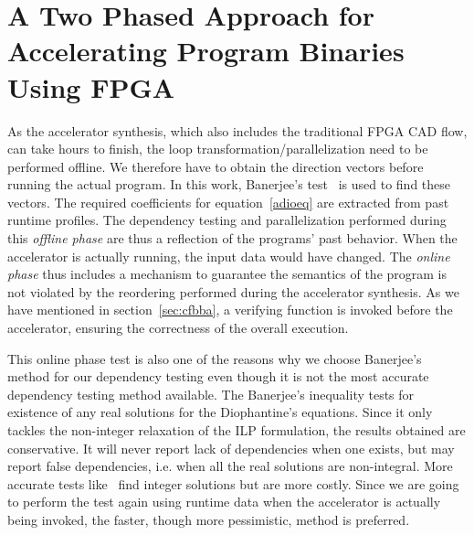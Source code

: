 \section{A Two Phased Approach for Accelerating Program Binaries Using FPGA}
\label{makingAcc}
As the accelerator synthesis, which also includes the traditional FPGA CAD flow,
can take hours to finish, the loop transformation/parallelization need to be performed offline. We therefore have to obtain the direction vectors 
before running the actual program. 
In this work, Banerjee's test~\cite{banerjee} is used to find these vectors. The required coefficients for equation~\ref{adioeq} are extracted from past runtime profiles. The dependency testing and parallelization performed during this \textit{offline phase} are  thus a reflection of the programs' past behavior. When the accelerator is actually running, the input data would have changed. The \textit{online phase} thus includes a mechanism to guarantee the 
semantics of the program is not violated by the reordering performed during
the accelerator synthesis. As we have mentioned in section~\ref{sec:cfbba},
a verifying function is invoked before the accelerator, ensuring the correctness
of the overall execution. 



This online phase test is also one of the reasons why we choose Banerjee's method for our dependency testing even though it is not the most accurate dependency testing method
available. The Banerjee's inequality tests for existence of any real solutions for the Diophantine's equations. Since it only tackles the non-integer relaxation of the ILP formulation, the results obtained are conservative.
It will never report lack of dependencies when one exists,  but may report false dependencies, i.e. when all the real solutions are non-integral.
 More accurate tests like~\cite{omega} find integer solutions but are more costly. Since we are
going to perform the test again using runtime data when the accelerator is actually
being invoked, the faster, though more pessimistic, method is preferred.

